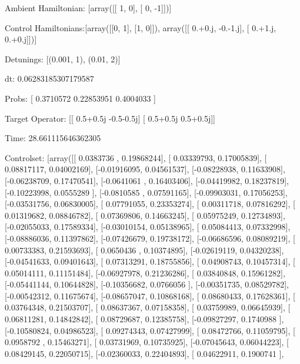 \documentclass{article}
\begin{document}
    

\newpage

Ambient Hamiltonian: [array([[ 1,  0],
       [ 0, -1]])]

Control Hamiltonians:[array([[0, 1],
       [1, 0]]), array([[ 0.+0.j, -0.-1.j],
       [ 0.+1.j,  0.+0.j]])]

Detunings: [(0.001, 1), (0.01, 2)]

 dt: 0.06283185307179587

Probs: [ 0.3710572   0.22853951  0.4004033 ]

Target Operator: [[ 0.5+0.5j -0.5-0.5j]
 [ 0.5+0.5j  0.5+0.5j]]

Time: 28.661115646362305

Controlset: [array([[ 0.0383736 ,  0.19868244],
       [ 0.03339793,  0.17005839],
       [ 0.08817117,  0.04002169],
       [-0.01916095,  0.04561537],
       [-0.08228938,  0.11633908],
       [-0.06238709,  0.17470541],
       [-0.0641061 ,  0.16403406],
       [-0.04419982,  0.18237819],
       [-0.10223998,  0.0555289 ],
       [-0.0810585 ,  0.07591165],
       [-0.09903031,  0.17056253],
       [-0.03531756,  0.06830005],
       [ 0.07791055,  0.23353274],
       [ 0.00311718,  0.07816292],
       [ 0.01319682,  0.08846782],
       [ 0.07369806,  0.14663245],
       [ 0.05975249,  0.12734893],
       [-0.02055033,  0.17589334],
       [-0.03010154,  0.05138965],
       [ 0.05084413,  0.07332998],
       [-0.08886036,  0.11397862],
       [-0.07426679,  0.19738172],
       [-0.06686596,  0.08089219],
       [ 0.00733383,  0.21593693],
       [ 0.0650436 ,  0.10374895],
       [-0.02619119,  0.04320238],
       [-0.04541633,  0.09401643],
       [ 0.07313291,  0.18755856],
       [ 0.04908743,  0.10457314],
       [ 0.05014111,  0.11151484],
       [-0.06927978,  0.21236286],
       [ 0.03840848,  0.15961282],
       [-0.05441144,  0.10644828],
       [-0.10356682,  0.0766056 ],
       [-0.00351735,  0.08529782],
       [-0.00542312,  0.11675674],
       [-0.08657047,  0.10868168],
       [ 0.08680433,  0.17628361],
       [ 0.03764348,  0.21503707],
       [ 0.08637367,  0.07158358],
       [ 0.03759989,  0.06645939],
       [ 0.06811281,  0.14842842],
       [ 0.08729687,  0.12385758],
       [-0.09827297,  0.1740988 ],
       [-0.10580824,  0.04986523],
       [ 0.09274343,  0.07427999],
       [ 0.08472766,  0.11059795],
       [ 0.0958792 ,  0.15463271],
       [ 0.03731969,  0.10735925],
       [-0.07045643,  0.06044223],
       [ 0.08429145,  0.22050715],
       [-0.02360033,  0.22404893],
       [ 0.04622911,  0.1900741 ],
\end{document}
